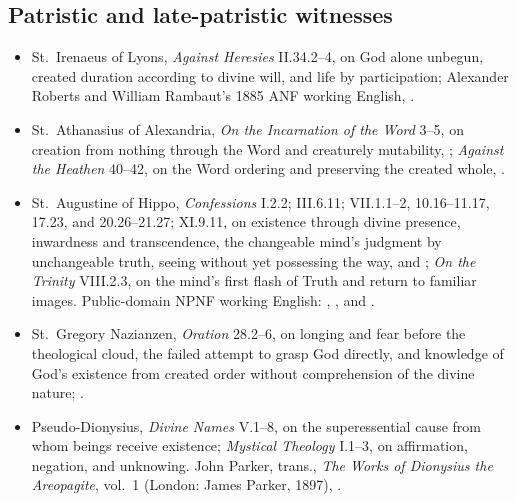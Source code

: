 \subsection*{Patristic and late-patristic witnesses}

{\fontsize{8.6}{9.6}\selectfont
\begin{itemize}[itemsep=0pt,parsep=0pt,topsep=0.05em]
\item St.~Irenaeus of Lyons, \emph{Against Heresies} II.34.2--4, on God alone unbegun, created duration according to divine will, and life by participation; Alexander Roberts and William Rambaut's 1885 ANF working English, .
\item St.~Athanasius of Alexandria, \emph{On the Incarnation of the Word} 3--5, on creation from nothing through the Word and creaturely mutability, ; \emph{Against the Heathen} 40--42, on the Word ordering and preserving the created whole, .
\item St.~Augustine of Hippo, \emph{Confessions} I.2.2; III.6.11; VII.1.1--2, 10.16--11.17, 17.23, and 20.26--21.27; XI.9.11, on existence through divine presence, inwardness and transcendence, the changeable mind's judgment by unchangeable truth, seeing without yet possessing the way, and ; \emph{On the Trinity} VIII.2.3, on the mind's first flash of Truth and return to familiar images. Public-domain NPNF working English: , , and .
\item St.~Gregory Nazianzen, \emph{Oration} 28.2--6, on longing and fear before the theological cloud, the failed attempt to grasp God directly, and knowledge of God's existence from created order without comprehension of the divine nature; .
\item Pseudo-Dionysius, \emph{Divine Names} V.1--8, on the superessential cause from whom beings receive existence; \emph{Mystical Theology} I.1--3, on affirmation, negation, and unknowing. John Parker, trans., \emph{The Works of Dionysius the Areopagite}, vol.~1 (London: James Parker, 1897), .
\end{itemize}}

